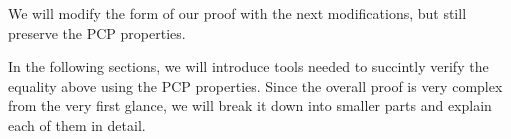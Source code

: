 \documentclass[../lecture-notes.tex]{subfiles}
\begin{document}
We will modify the form of our proof with the next modifications, but still preserve the PCP 
properties.

In the following sections, we will introduce tools needed to succintly verify the equality above
using the PCP properties. Since the overall proof is very complex from the very first glance, 
we will break it down into smaller parts and explain each of them in detail.
\end{document}
